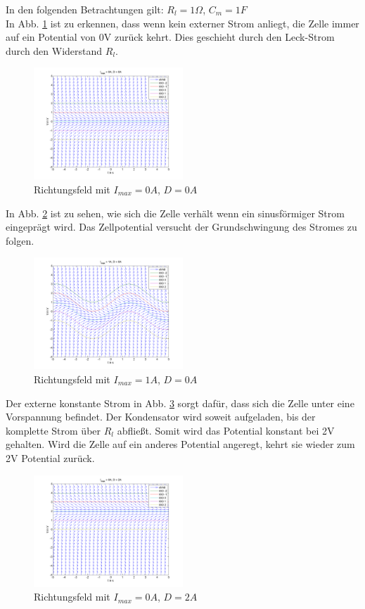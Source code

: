 \documentclass[conference]{IEEEtran}
\begin{document}
\newpage
In den folgenden Betrachtungen gilt: $R_l=1\Omega$, $C_m=1F$\\
In Abb. \ref{fig:slope1} ist zu erkennen, dass wenn kein externer Strom anliegt, die Zelle immer auf ein Potential von 0V zurück kehrt. Dies geschieht durch den Leck-Strom durch den Widerstand $R_l$.
\begin{figure}[h!]
	\centering
	\includegraphics[width=0.5\textwidth]{img/slopefield1.png}
	\caption{Richtungsfeld mit $I_{max}=0A$, $D=0A$}
	\label{fig:slope1}
\end{figure}

In Abb. \ref{fig:slope2} ist zu sehen, wie sich die Zelle verhält wenn ein sinusförmiger Strom eingeprägt wird. Das Zellpotential versucht der Grundschwingung des Stromes zu folgen. 
\begin{figure}[h!]
	\centering
	\includegraphics[width=0.5\textwidth]{img/slopefield2.png}
	\caption{Richtungsfeld mit $I_{max}=1A$, $D=0A$}
	\label{fig:slope2}
\end{figure}

Der externe konstante Strom in Abb. \ref{fig:slope3} sorgt dafür, dass sich die Zelle unter eine Vorspannung befindet. Der Kondensator wird soweit aufgeladen, bis der komplette Strom über $R_l$ abfließt. Somit wird das Potential konstant bei 2V gehalten. Wird die Zelle auf ein anderes Potential angeregt, kehrt sie wieder zum 2V Potential zurück.\\
\begin{figure}[h!]
	\centering
	\includegraphics[width=0.5\textwidth]{img/slopefield3.png}
	\caption{Richtungsfeld mit $I_{max}=0A$, $D=2A$}
	\label{fig:slope3}
\end{figure}
\end{document}
